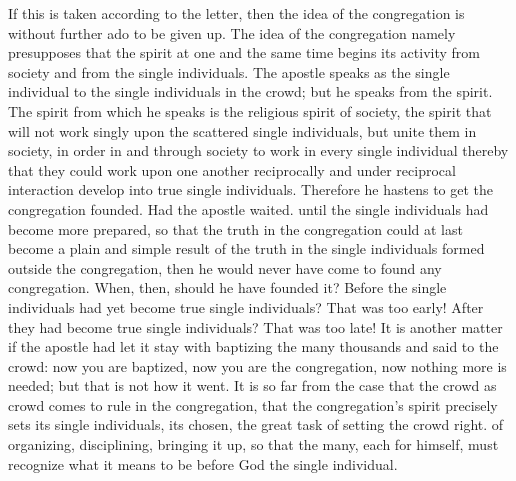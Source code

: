 \documentclass[12pt,a4paper,openany]{book}
\newcommand{\opage}[1]{\marginnote{\footnotesize\textit{[#1]}}}
\begin{document}
If this is taken according to the letter, then the idea of the congregation
is without further ado to be given up. The idea of the congregation
namely presupposes that the spirit at one and the same time begins its
activity from society and from the single individuals.
The apostle speaks as the single individual to the single individuals in the crowd;
but he speaks from the spirit. The spirit from which he
speaks is the religious spirit of society, the spirit that
will not work singly upon the scattered single individuals, but
unite them in society, in order in and through society to
work in every single individual thereby that they could work upon
\setcounter{footnote}{0}%
\opage{32}one another reciprocally and under reciprocal interaction
develop into true single individuals. Therefore he hastens to
get the congregation founded. Had the apostle waited.
until the single individuals had become more prepared, so that
the truth in the congregation could at last become a plain and
simple result of the truth in the single individuals formed
outside the congregation, then he would never have come to found
any congregation. When, then, should he have founded it?
Before the single individuals had yet become true single individuals? That
was too early! After they had become true single individuals?
That was too late! It is another matter if the apostle
had let it stay with baptizing the many thousands
and said to the crowd: now you are baptized, now you are the congregation,
now nothing more is needed; but that is not how it
went. It is so far from the case that the crowd as
crowd comes to rule in the congregation, that the congregation's
spirit precisely sets its single individuals, its chosen,
the great task of setting the crowd right.
of organizing, disciplining, bringing it up, so that the many, each for himself,
must recognize what it means to be before God the
single individual.
\end{document}
